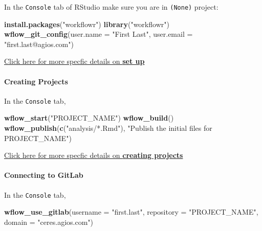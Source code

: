 \documentclass[openany]{article}
\newenvironment{Shaded}{\begin{snugshade}}{\end{snugshade}}
\newcommand{\DataTypeTok}[1]{\textcolor[rgb]{0.13,0.29,0.53}{#1}}
\newcommand{\KeywordTok}[1]{\textcolor[rgb]{0.13,0.29,0.53}{\textbf{#1}}}
\newcommand{\NormalTok}[1]{#1}
\newcommand{\StringTok}[1]{\textcolor[rgb]{0.31,0.60,0.02}{#1}}
\let\oldparagraph\paragraph
\renewcommand{\paragraph}[1]{\oldparagraph{#1}\mbox{}}
\begin{document}
In the \texttt{Console} tab of RStudio make sure you are in \texttt{(None)} project:

\begin{Shaded}
\begin{Highlighting}[]
\KeywordTok{install.packages}\NormalTok{(}\StringTok{"workflowr"}\NormalTok{)}
\KeywordTok{library}\NormalTok{(}\StringTok{"workflowr"}\NormalTok{)}
\KeywordTok{wflow_git_config}\NormalTok{(}\DataTypeTok{user.name =} \StringTok{"First Last"}\NormalTok{, }
    \DataTypeTok{user.email =} \StringTok{"first.last@agios.com"}\NormalTok{)}
\end{Highlighting}
\end{Shaded}

\protect\hyperlink{installation}{Click here for more specfic details on \textbf{set up}}

\hypertarget{creating-projects}{%
\paragraph{Creating Projects}\label{creating-projects}}

In the \texttt{Console} tab,

\begin{Shaded}
\begin{Highlighting}[]
\KeywordTok{wflow_start}\NormalTok{(}\StringTok{"PROJECT_NAME"}\NormalTok{)}
\KeywordTok{wflow_build}\NormalTok{()}
\KeywordTok{wflow_publish}\NormalTok{(}\KeywordTok{c}\NormalTok{(}\StringTok{"analysis/*.Rmd"}\NormalTok{), }
    \StringTok{"Publish the initial files for PROJECT_NAME"}\NormalTok{)}
\end{Highlighting}
\end{Shaded}

\protect\hyperlink{create-project}{Click here for more specfic details on \textbf{creating projects}}

\hypertarget{connecting-to-gitlab}{%
\paragraph{Connecting to GitLab}\label{connecting-to-gitlab}}

In the \texttt{Console} tab,

\begin{Shaded}
\begin{Highlighting}[]
\KeywordTok{wflow_use_gitlab}\NormalTok{(}\DataTypeTok{username =} \StringTok{"first.last"}\NormalTok{, }
    \DataTypeTok{repository =} \StringTok{"PROJECT_NAME"}\NormalTok{, }
    \DataTypeTok{domain =} \StringTok{"ceres.agios.com"}\NormalTok{)}
\end{Highlighting}
\end{Shaded}
\end{document}
